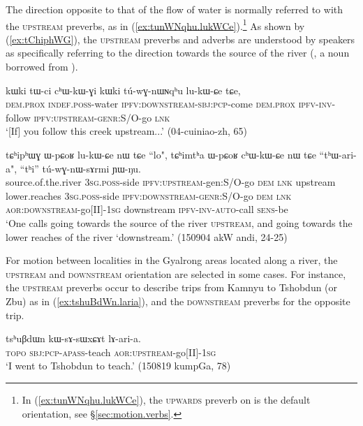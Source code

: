 The direction opposite to that of the flow of water is normally referred to with the \textsc{upstream} preverbs, as in (\ref{ex:tunWNqhu.lukWCe}).\footnote{In (\ref{ex:tunWNqhu.lukWCe}), the \textsc{upwards} preverb on  is the default orientation, see §\ref{sec:motion.verbs}. } As shown by (\ref{ex:tChiphWG}), the \textsc{upstream} preverbs and adverbs are understood by speakers as specifically referring to the direction towards the source of the river (, a noun borrowed from ).

 \begin{exe}
\ex \label{ex:tunWNqhu.lukWCe}
\gll  kɯki tɯ-ci cʰɯ-kɯ-ɣi kɯki tú-wɣ-nɯɴqʰu lu-kɯ-ɕe tɕe,  \\
\textsc{dem}.\textsc{prox} \textsc{indef}.\textsc{poss}-water \textsc{ipfv}:\textsc{downstream}-\textsc{sbj}:\textsc{pcp}-come \textsc{dem}.\textsc{prox} \textsc{ipfv}-\textsc{inv}-follow \textsc{ipfv}:\textsc{upstream}-\textsc{genr}:S/O-go \textsc{lnk} \\
\glt `[If] you follow this creek upstream...' (04-cuiniao-zh, 65)
\end{exe}

\begin{exe}
\ex \label{ex:tChiphWG}
\gll   tɕʰipʰɯɣ ɯ-pɕoʁ lu-kɯ-ɕe nɯ tɕe ``lo", tɕʰimtʰa ɯ-pɕoʁ cʰɯ-kɯ-ɕe nɯ tɕe ``tʰɯ-ari-a",  ``tʰi'' tú-wɣ-nɯ-sɤrmi ɲɯ-ŋu.  \\
source.of.the.river \textsc{3sg}.\textsc{poss}-side \textsc{ipfv}:\textsc{upstream}-gen:S/O-go \textsc{dem} \textsc{lnk} upstream lower.reaches \textsc{3sg}.\textsc{poss}-side \textsc{ipfv}:\textsc{downstream}-\textsc{genr}:S/O-go \textsc{dem} \textsc{lnk} \textsc{aor}:\textsc{downstream}-go[II]-\textsc{1sg} downstream \textsc{ipfv}-\textsc{inv}-\textsc{auto}-call \textsc{sens}-be \\
\glt `One calls going towards the source of the river \textsc{upstream}, and going towards the lower reaches of the river `downstream.' (150904 akW andi, 24-25)
\end{exe}

For motion between localities in the Gyalrong areas located along a river, the \textsc{upstream} and \textsc{downstream} orientation are selected in some cases. For instance, the \textsc{upstream} preverbs occur to describe trips from Kamnyu to Tshobdun (or Zbu) as in (\ref{ex:tshuBdWn.laria}), and the \textsc{downstream} preverbs for the opposite trip.

 \begin{exe}
\ex \label{ex:tshuBdWn.laria}
\gll  tsʰuβdɯn kɯ-sɤ-sɯxɕɤt lɤ-ari-a. \\
\textsc{topo} \textsc{sbj}:\textsc{pcp}-\textsc{apass}-teach \textsc{aor}:\textsc{upstream}-go[II]-\textsc{1sg} \\
\glt `I went to Tshobdun to teach.' (150819 kumpGa, 78)
\end{exe}

